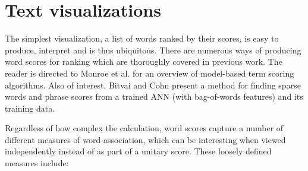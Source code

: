 \documentclass[11pt,a4paper]{article}
\begin{document}
\section{Text visualizations}
\label{related}
The simplest visualization, a list of words ranked by their scores, is easy to produce, interpret and is thus ubiquitous.  There are numerous ways of producing word scores for ranking which are thoroughly covered in previous work.  The reader is directed to Monroe et al.  for an overview of model-based term scoring algorithms.  Also of interest, Bitvai and Cohn  present a method for finding sparse words and phrase scores from a trained ANN (with bag-of-words features) and its training data. 

Regardless of how complex the calculation, word scores capture a number of different measures of word-association, which can be interesting when viewed independently instead of as part of a unitary score.  These loosely defined measures include:  \vspace{-0.1in}
\end{document}
